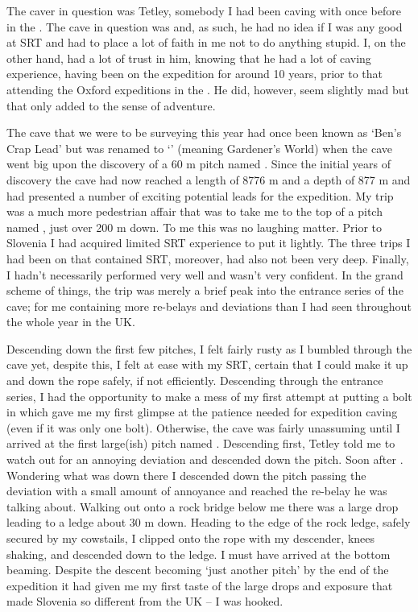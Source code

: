 The caver in question was Tetley, somebody I had been caving with once
before in the . The cave in question was  and, as
such, he had no idea if I was any good at SRT and had to place a lot of
faith in me not to do anything stupid. I, on the other hand, had a lot
of trust in him, knowing that he had a lot of caving experience, having
been on the expedition for around 10 years, prior to that attending the
Oxford expeditions in the . He did, however, seem slightly mad but
that only added to the sense of adventure.

The cave that we were to be surveying this year had once been known as
`Ben's Crap Lead' but was renamed to `' (meaning
Gardener's World) when the cave went big upon the discovery of a 60 m
pitch named . Since the initial years of discovery the cave had now
reached a length of 8776 m and a depth of 877 m and had presented a
number of exciting potential leads for the expedition. My trip was a
much more pedestrian affair that was to take me to the top of a pitch
named , just over 200 m down. To me this was no
laughing matter. Prior to Slovenia I had acquired limited SRT experience
to put it lightly. The three trips I had been on that contained SRT,
moreover, had also not been very deep. Finally, I hadn't necessarily
performed very well and wasn't very confident. In the grand scheme of
things, the trip was merely a brief peak into the entrance series of the
cave; for me  containing more
re-belays and deviations than I had seen throughout the whole year in
the UK.

Descending down the first few pitches, I felt fairly rusty as I bumbled
through the cave yet, despite this, I felt at ease with my SRT, certain
that I could make it up and down the rope safely, if not efficiently.
Descending through the entrance series, I had the opportunity to make a
mess of my first attempt at putting a bolt in which gave me my first
glimpse at the patience needed for expedition caving (even if it was
only one bolt). Otherwise, the cave was fairly unassuming until I
arrived at the first large(ish) pitch named . Descending first,
Tetley told me to watch out for an annoying deviation and descended down
the pitch. Soon after . Wondering
what was down there I descended down the pitch passing the deviation
with a small amount of annoyance and reached the re-belay he was talking
about. Walking out onto a rock bridge below me there was a large drop
leading to a ledge about 30 m down. Heading to the edge of the rock ledge,
safely secured by my cowstails, I clipped onto the rope with my
descender, knees shaking, and descended down to the ledge. I must have
arrived at the bottom beaming. Despite the descent becoming `just
another pitch' by the end of the expedition it had given me my first
taste of the large drops and exposure that made Slovenia so different
from the UK -- I was hooked.


